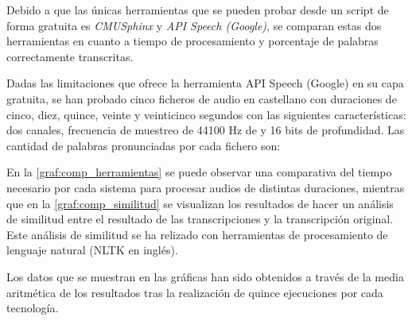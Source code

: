 \documentclass[../main.tex]{subfiles}
\begin{document}
Debido a que las únicas herramientas que se pueden probar desde un \gls{script} de forma gratuita es \textit{CMUSphinx} y \textit{API Speech (Google)}, se comparan estas dos herramientas en cuanto a tiempo de procesamiento y porcentaje de palabras correctamente transcritas.

Dadas las limitaciones que ofrece la herramienta API Speech (Google) en su capa gratuita, se han probado cinco ficheros de audio en castellano con duraciones de cinco, diez, quince, veinte y veinticinco segundos con las siguientes características: dos canales, frecuencia de muestreo de 44100 Hz de y 16 bits de profundidad. Las cantidad de palabras pronunciadas por cada fichero son: 

\begin{table}[H]
    \centering
    \caption{Información de audios de prueba.}
    \label{tab:audios-palabras}
\end{table}


En la \autoref{graf:comp_herramientas} se puede observar una comparativa del tiempo necesario por cada sistema para procesar audios de distintas duraciones, mientras que en la \autoref{graf:comp_similitud} se visualizan los resultados de hacer un análisis de similitud entre el resultado de las transcripciones y la transcripción original. Este análisis de similitud se ha relizado con herramientas de procesamiento de lenguaje natural (NLTK en inglés).

Los datos que se muestran en las gráficas han sido obtenidos a través de la media aritmética de los resultados tras la realización de quince ejecuciones por cada tecnología.
\end{document}
